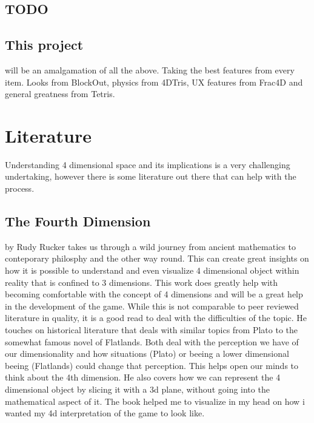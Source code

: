 \documentclass{article}
\begin{document}
\subsection{ TODO }


\subsection{This project}
will be an amalgamation of all the above. Taking the best features from every item. Looks from BlockOut, physics from 4DTris, UX features from Frac4D and general greatness from Tetris.

\section{Literature}
Understanding 4 dimensional space and its implications is a very challenging undertaking, however there is some literature out there that can help with the process. 

\subsection{The Fourth Dimension} by Rudy Rucker \cite{rucker} takes us through a wild journey from ancient mathematics to conteporary philosphy and the other way round. This can create great insights on how it is possible to understand and even visualize 4 dimensional object within reality that is confined to 3 dimensions. This work does greatly help with becoming comfortable with the concept of 4 dimensions and will be a great help in the development of the game.
\newline
While this is not comparable to peer reviewed literature in quality, it is a good read to deal with the difficulties of the topic. He touches on historical literature that deals with similar topics from Plato to the somewhat famous novel of Flatlands. Both deal with the perception we have of our dimensionality and how situations (Plato) or beeing a lower dimensional beeing (Flatlands) could change that perception. This helps open our minds to think about the 4th dimension. He also covers how we can represent the 4 dimensional object by slicing it with a 3d plane, without going into the mathematical aspect of it. 
The book helped me to visualize in my head on how i wanted my 4d interpretation of the game to look like.
\end{document}
